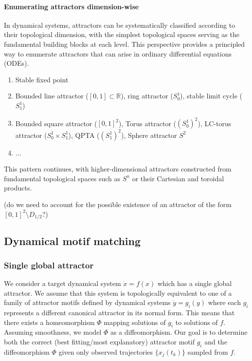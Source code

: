 \documentclass{article}
\newcommand{\ascomment}[1]{\textcolor{ascolor}{(#1)}}
\theoremstyle{definition} \newtheorem{definition}{Definition}  \newtheorem{example}{Example}
\theoremstyle{remark} \newtheorem{remark}{Remark}
\newcommand{\reals}{\mathbb{R}}
\newcounter{ct}
\begin{document}
\paragraph{Enumerating attractors dimension-wise}
In dynamical systems, attractors can be systematically classified according to their topological dimension, with the simplest topological spaces serving as the fundamental building blocks at each level. This perspective provides a principled way to enumerate attractors that can arise in ordinary differential equations (ODEs).
\begin{enumerate}[start=0,label={\bfseries Dim \arabic*:}]
\item  Stable fixed point
\item  Bounded line attractor ($[0,1]\subset\reals$), ring attractor ($S_0^1$), stable limit cycle ($S_1^1$)
\item Bounded square attractor ($[0,1]^2$), Torus attractor ($(S_0^1)^2$), LC-torus attractor ($S_0^1\times S_1^1$), QPTA ($(S_1^1)^2$), Sphere attractor $S^2$
\item ...
\end{enumerate}

This pattern continues, with higher-dimensional attractors constructed from fundamental topological spaces such as $S^n$ or their Cartesian and toroidal products.

\ascomment{do we need to account for the possible existence of an attractor of the form $[0,1]^2\setminus D_{1/2}$?}




\subsection{Dynamical motif matching}
\subsubsection{Single global attractor}
We consider a target dynamical system $\dot{x} = f(x)$ which has a single global attractor.
 We assume that this system is topologically equivalent to one of a family of attractor motifs defined by dynamical systems $\dot{y} = g_i(y)$ where each $g_i$ represents a different canonical attractor in its normal form.
  This means that there exists a homeomorphism $\Phi$ mapping solutions of $g_i$ to solutions of $f$.
  Assuming smoothness, we model $\Phi$ as a diffeomorphism.
Our goal is to determine both the correct (best fitting/most explanatory) attractor motif $g_i$ and the diffeomorphism $\Phi$ given only observed trajectories $\{x_j(t_k)\}$ sampled from $f$.
\end{document}
